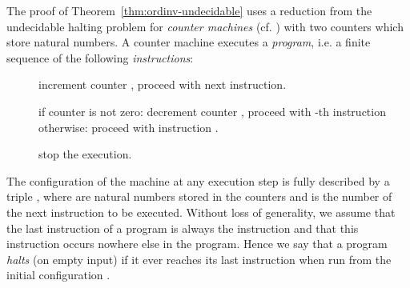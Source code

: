 \documentclass[11pt]{article}
\begin{document}
The proof of Theorem~\ref{thm:ordinv-undecidable} uses a reduction from the
undecidable halting problem for \emph{counter machines} (cf. \cite{Minsky1967})
with two counters which store natural numbers. A counter machine executes a
\emph{program}, i.e. a finite sequence of the following \emph{instructions}:
\begin{description}
\item[]  increment counter , proceed with next instruction.
\item[] if counter  is not zero: decrement counter ,
  proceed with -th instruction otherwise: proceed with instruction .
\item[] stop the execution. 
\end{description}

The configuration of the machine at any execution step is fully described by
a triple , where  are natural numbers
stored in the counters and  is the number of the next
instruction to be executed. Without loss of generality, we assume
that the last instruction of a program is always the 
instruction and that this instruction occurs nowhere else in the
program. Hence we say that a program \emph{halts} (on empty input) if
it ever reaches its last instruction when run from the initial
configuration . 
\end{document}
